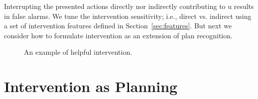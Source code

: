 \documentclass[letterpaper]{article}
\theoremstyle{plain}
\begin{document}
Interrupting the presented actions directly nor indirectly contributing to $\mathrm{u}$ results in false alarms.
We tune the intervention sensitivity; i.e., direct vs. indirect using a set of intervention features defined in Section~\ref{sec:features}.
But next we consider how to formulate intervention as an extension of plan recognition.

\begin{figure}[ptb]
         \vspace{-1em}
        \caption{An example of helpful intervention.}
        \vspace{-1em}
        \label{fig:single}
\end{figure}


\section{Intervention as Planning}
\label{sec:intervention}
\end{document}
